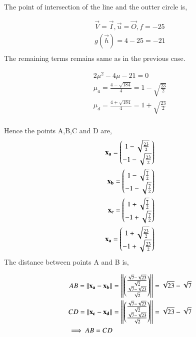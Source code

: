 \documentclass[journal,12pt,twocolumn]{IEEEtran}
\renewcommand\thesection{\arabic{section}}
\begin{document}
\begin{enumerate}
The point of intersection of the line and the outter circle is,

		\begin{align}
			\vec{V} = \vec{I}, \vec{u}=\vec{O},f=-25\\
			g(\vec{h}) = 4-25=-21\\
		\end{align}	
The remaining terms remains same as in the previous case.

		\begin{align}
			2\mu^2-4\mu-21=0\\
			\mu_a = \frac{4-\sqrt{184}}{4} = 1-\sqrt{\frac{23}{2}}\\
			\mu_d = \frac{4+\sqrt{184}}{4} = 1+\sqrt{\frac{23}{2}}\\
		\end{align}

Hence the points A,B,C and D are,
\begin{align}
	\mathbf{x_a} = \begin{pmatrix}1-\sqrt{\frac{23}{2}}\\-1-\sqrt{\frac{23}{2}}\end{pmatrix}\\
	\mathbf{x_b} = \begin{pmatrix}1-\sqrt{\frac{7}{2}}\\-1-\sqrt{\frac{7}{2}}\end{pmatrix}\\
	\mathbf{x_c} = \begin{pmatrix}1+\sqrt{\frac{7}{2}}\\-1+\sqrt{\frac{7}{2}}\end{pmatrix}\\
	\mathbf{x_a} = \begin{pmatrix}1+\sqrt{\frac{23}{2}}\\-1+\sqrt{\frac{23}{2}}\end{pmatrix}\\
\end{align}
The distance between points A and B is,

		\begin{align}
			AB = \left\lVert\mathbf{x_a}-\mathbf{x_b}\right\rVert &= \left\lVert\begin{pmatrix}\frac{\sqrt{7}-\sqrt{23}}{\sqrt{2}}\\\frac{\sqrt{7}-\sqrt{23}}{\sqrt{2}}\end{pmatrix}\right\rVert = \sqrt{23}-\sqrt{7}\\
			CD = \left\lVert\mathbf{x_c}-\mathbf{x_d}\right\rVert &= \left\lVert\begin{pmatrix}\frac{\sqrt{7}-\sqrt{23}}{\sqrt{2}}\\\frac{\sqrt{7}-\sqrt{23}}{\sqrt{2}}\end{pmatrix}\right\rVert = \sqrt{23}-\sqrt{7}\\
			\implies AB=CD
		\end{align}

\end{enumerate}

%
\end{document}
